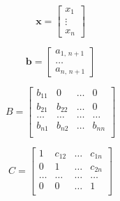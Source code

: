 \begin{equation*}
    \boldsymbol{x} =
    \left[ \begin{array}{c}
               x_1    \\
               \vdots \\
               x_n
    \end{array}
        \right]
\end{equation*}

\begin{equation*}
    \boldsymbol{b} =
    \left[ \begin{array}{c}
               a_{1,\,n + 1} \\
               \ldots        \\
               a_{n,\,n + 1}
    \end{array}
        \right]
\end{equation*}

\begin{equation*}
    B =
    \left[ \begin{array}{cccc}
               b_{11} & 0      & \ldots & 0      \\
               b_{21} & b_{22} & \ldots & 0      \\
               \ldots & \ldots & \ldots & \ldots \\
               b_{n1} & b_{n2} & \ldots & b_{nn} \\
    \end{array}
        \right]
\end{equation*}

\begin{equation*}
    C =
    \left[ \begin{array}{cccc}
               1      & c_{12} & \ldots & c_{1n} \\
               0      & 1      & \ldots & c_{2n} \\
               \ldots & \ldots & \ldots & \ldots \\
               0      & 0      & \ldots & 1      \\
    \end{array}
        \right]
\end{equation*}